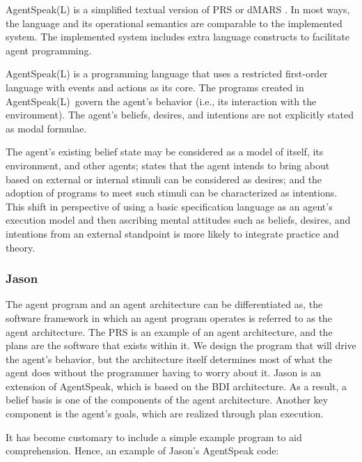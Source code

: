 AgentSpeak(L) is a simplified textual version of \ac{PRS} \cite{prs} or \ac{dMARS} \cite{dmars}. In most ways, the language and its operational semantics are comparable to the implemented system. The implemented system includes extra language constructs to facilitate agent programming.

\vspace{.5cm}

AgentSpeak(L) is a programming language that uses a restricted first-order language with events and actions as its core. The programs created in AgentSpeak(L) govern the agent's behavior (i.e., its interaction with the environment). The agent's beliefs, desires, and intentions are not explicitly stated as modal formulae.

\vspace{.5cm}

The agent's existing belief state may be considered as a model of itself, its environment, and other agents; states that the agent intends to bring about based on external or internal stimuli can be considered as desires; and the adoption of programs to meet such stimuli can be characterized as intentions. This shift in perspective of using a basic specification language as an agent's execution model and then ascribing mental attitudes such as beliefs, desires, and intentions from an external standpoint is more likely to integrate practice and theory.

\subsubsection{Jason}

The agent program and an agent architecture can be differentiated as, the software framework in which an agent program operates is referred to as the agent architecture. The \ac{PRS} is an example of an agent architecture, and the plans are the software that exists within it. We design the program that will drive the agent's behavior, but the architecture itself determines most of what the agent does without the programmer having to worry about it. Jason is an extension of AgentSpeak, which is based on the \ac{BDI} architecture. As a result, a belief basis is one of the components of the agent architecture. Another key component is the agent's goals, which are realized through plan execution.

\vspace{.5cm}

It has become customary to include a simple example program to aid comprehension. Hence, an example of Jason's AgentSpeak code:

